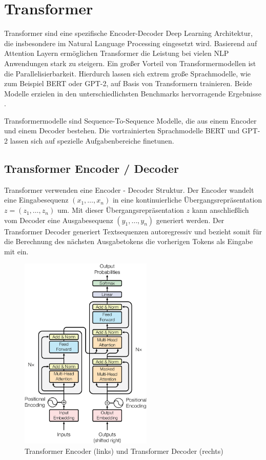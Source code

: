 \section{Transformer}\raggedbottom \label{transformer}
Transformer sind eine spezifische Encoder-Decoder Deep Learning Architektur, die insbesondere im Natural Language Processing eingesetzt wird. 
Basierend auf Attention Layern ermöglichen Transformer die Leistung bei vielen NLP Anwendungen stark zu steigern. 
Ein großer Vorteil von Transformermodellen ist die Parallelisierbarkeit. 
Hierdurch lassen sich extrem große Sprachmodelle, wie zum Beispiel BERT oder GPT-2, auf Basis von Transformern trainieren. 
Beide Modelle erzielen in den unterschiedlichsten Benchmarks hervorragende Ergebnisse \citep{DBLP:journals/corr/abs-1810-04805}.

Transformermodelle sind Sequence-To-Sequence Modelle, die aus einem Encoder und einem Decoder bestehen.
Die vortrainierten Sprachmodelle BERT und GPT-2 lassen sich auf spezielle Aufgabenbereiche finetunen.


\subsection{Transformer Encoder / Decoder}
Transformer verwenden eine Encoder - Decoder Struktur. Der Encoder wandelt eine Eingabesequenz $(x_1,\ldots,x_n)$ in eine kontinuierliche Übergangsrepräsentation $z=(z_1, \ldots, z_n)$ um. 
Mit dieser Übergangsrepräsentation $z$ kann anschließlich vom Decoder eine Ausgabesequenz $(y_1, \ldots, y_n)$ generiert werden.
Der Transformer Decoder generiert Textsequenzen autoregressiv und bezieht somit für die Berechnung des nächsten Ausgabetokens die vorherigen Tokens als Eingabe mit ein.


\begin{figure}[h]
    
    \centering
    \includegraphics[width=6.3cm]{bilder/Transformer-Encoder-Decoder}
    \caption{Transformer Encoder (links) und Transformer Decoder (rechts) \citep{AttentionIALYN}}
    \label{transformerfig}
\end{figure}

